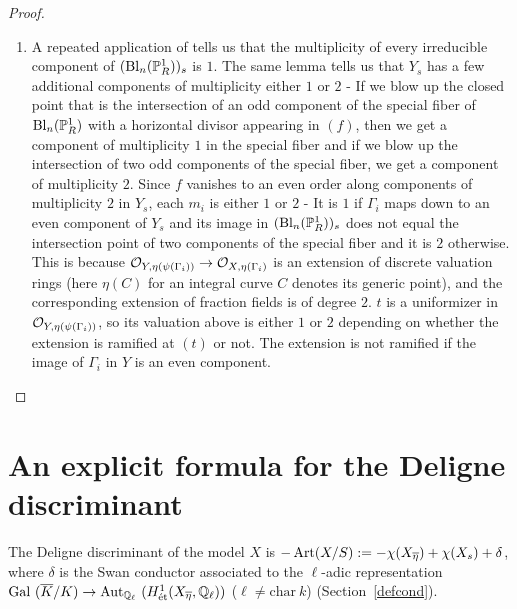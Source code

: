 \begin{proof}
\begin{enumerate}[\upshape (a)]
\item A repeated application of \cite[Lemma~1.4]{liulor} tells us that the multiplicity of every irreducible component of $(\mathrm{Bl}_n(\P^1_R))_s$ is $1$. The same lemma tells us that $Y_s$ has a few additional components of multiplicity either $1$ or $2$ - If we blow up the closed point that is the intersection of an odd component of the special fiber of $\mathrm{Bl}_n(\P^1_R)$ with a horizontal divisor appearing in $(f)$, then we get a component of multiplicity $1$ in the special fiber and if we blow up the intersection of two odd components of the special fiber, we get a component of multiplicity $2$. Since $f$ vanishes to an even order along components of multiplicity $2$ in $Y_s$, each $m_i$ is either $1$ or $2$ - It is $1$ if $\Gamma_i$ maps down to an even component of $Y_s$ and its image in $(\mathrm{Bl}_n(\P^1_R))_s$ does not equal the intersection point of two components of the special fiber and it is $2$ otherwise. This is because $\O_{Y,\eta(\psi(\Gamma_i))} \rightarrow \O_{X,\eta(\Gamma_i)}$ is an extension of discrete valuation rings (here $\eta(C)$ for an integral curve $C$ denotes its generic point), and the corresponding extension of fraction fields is of degree $2$. $t$ is a uniformizer in $\O_{Y,\eta(\psi(\Gamma_i))}$, so its valuation above is either $1$ or $2$ depending on whether the extension is ramified at $(t)$ or not. The extension is not ramified if the image of $\Gamma_i$ in $Y$ is an even component. \qedhere
\end{enumerate}
\end{proof}


\section{An explicit formula for the Deligne discriminant}\label{explicitformula}
The Deligne discriminant of the model $X$ is $-\Art (X/S) := -\chi(X_{\overline{\eta}})+\chi(X_s)+\delta$, where $\delta$ is the Swan conductor associated to the $\ell$-adic representation $\mathrm{Gal}\ (\overline{K}/K) \rightarrow \mathrm{Aut}_{\Q_\ell} \ (H^1_{\textup{\'{e}t}}(X_{\overline{\eta}}, \Q_\ell))$ ($\ell \neq \mathrm{char}\ k$) (Section~\ref{defcond}). 


